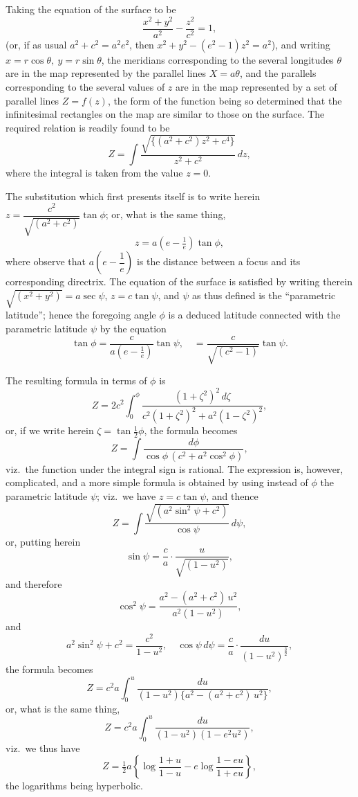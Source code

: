 \documentclass[11pt]{article}
\begin{document}
Taking the equation of the surface to be
\[
\frac{x^{2}+y^{2}}{a^{2}}-\frac{z^{2}}{c^{2}}=1,
\]
(or, if as usual $a^{2}+c^{2}=a^{2}e^{2}$, then $x^{2}+y^{2}-(e^{2}-1)z^{2}=a^{2}$), and
writing $x=r\cos\theta,\ y=r\sin\theta$, the meridians corresponding to the several
longitudes $\theta$ are in the map represented by the parallel lines $X=a\theta$, and
the parallels corresponding to the several values of $z$ are in the map represented by
a set of parallel lines $Z=f(z)$, the form of the function being so determined that
the infinitesimal rectangles on the map are similar to those on the surface. The
required relation is readily found to be
\[
Z=\int\frac{\sqrt{\{(a^{2}+c^{2})z^{2}+c^{4}\}}}{z^{2}+c^{2}}\,dz,
\]
where the integral is taken from the value $z=0$.

The substitution which first presents itself is to write herein
$z=\dfrac{c^{2}}{\sqrt{(a^{2}+c^{2})}}\tan\phi$; or, what is the same thing,
\[
z=a\!\left(e-\tfrac{1}{e}\right)\tan\phi,
\]
where observe that $a\!\left(e-\dfrac{1}{e}\right)$ is the distance between a focus and
its corresponding directrix. The equation of the surface is satisfied by writing therein
$\sqrt{(x^{2}+y^{2})}=a\sec\psi$, $z=c\tan\psi$, and $\psi$ as thus defined is the
``parametric latitude''; hence the foregoing angle $\phi$ is a deduced latitude
connected with the parametric latitude $\psi$ by the equation
\[
\tan\phi=\frac{c}{a\!\left(e-\frac{1}{e}\right)}\tan\psi,\quad=\frac{c}{\sqrt{(c^{2}-1)}}\tan\psi.
\]

The resulting formula in terms of $\phi$ is
\[
Z=2c^{2}\int_{0}^{\phi}\frac{(1+\zeta^{2})^{2}\,d\zeta}{c^{2}(1+\zeta^{2})^{2}+a^{2}(1-\zeta^{2})^{2}},
\]
or, if we write herein $\zeta=\tan\tfrac{1}{2}\phi$, the formula becomes
\[
Z=\int\frac{d\phi}{\cos\phi\,(c^{2}+a^{2}\cos^{2}\phi)},
\]
viz.\ the function under the integral sign is rational. The expression is, however,
complicated, and a more simple formula is obtained by using instead of $\phi$ the
parametric latitude $\psi$; viz.\ we have $z=c\tan\psi$, and thence
\[
Z=\int\frac{\sqrt{(a^{2}\sin^{2}\psi+c^{2})}}{\cos\psi}\,d\psi,
\]
or, putting herein
\[
\sin\psi=\frac{c}{a}\cdot\frac{u}{\sqrt{(1-u^{2})}},
\]
and therefore
\[
\cos^{2}\psi=\frac{a^{2}-(a^{2}+c^{2})\,u^{2}}{a^{2}(1-u^{2})},
\]
and
\[
a^{2}\sin^{2}\psi+c^{2}=\frac{c^{2}}{1-u^{2}},\quad \cos\psi\,d\psi=\frac{c}{a}\cdot\frac{du}{(1-u^{2})^{\frac{3}{2}}},
\]
the formula becomes
\[
Z=c^{2}a\int_{0}^{u}\frac{du}{(1-u^{2})\{a^{2}-(a^{2}+c^{2})\,u^{2}\}},
\]
or, what is the same thing,
\[
Z=c^{2}a\int_{0}^{u}\frac{du}{(1-u^{2})(1-e^{2}u^{2})},
\]
viz.\ we thus have
\[
Z=\tfrac{1}{2}a\left\{\log\frac{1+u}{1-u}-e\log\frac{1-eu}{1+eu}\right\},
\]
the logarithms being hyperbolic.
\end{document}
